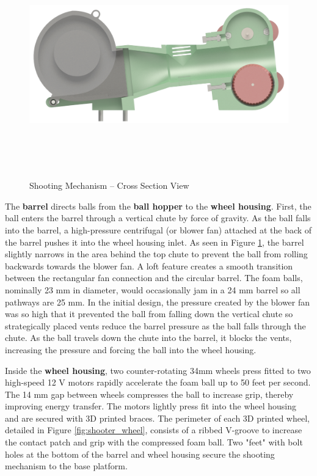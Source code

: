 \begin{figure}[H]   %
	\centering \includegraphics[width=6in, height=3.85in, keepaspectratio]{figures/shooter_xsec.png}
	\caption{Shooting Mechanism -- Cross Section View}	\label{fig:shooter_xsec}
\end{figure}

The \textbf{barrel} directs balls from the \textbf{ball hopper} to the \textbf{wheel housing}. First, the ball enters the barrel through a vertical chute by force of gravity. As the ball falls into the barrel, a high-pressure centrifugal (or blower fan) attached at the back of the barrel pushes it into the wheel housing inlet. As seen in Figure \ref{fig:shooter_xsec}, the barrel slightly narrows in the area behind the top chute to prevent the ball from rolling backwards towards the blower fan. A loft feature creates a smooth transition between the rectangular fan connection and the circular barrel. The foam balls, nominally 23 mm in diameter, would occasionally jam in a 24 mm barrel so all pathways are 25 mm. In the initial design, the pressure created by the blower fan was so high that it prevented the ball from falling down the vertical chute so strategically placed vents reduce the barrel pressure as the ball falls through the chute. As the ball travels down the chute into the barrel, it blocks the vents, increasing the pressure and forcing the ball into the wheel housing.

Inside the \textbf{wheel housing}, two counter-rotating 34mm wheels press fitted to two high-speed 12 V motors rapidly accelerate the foam ball up to 50 feet per second. The 14 mm gap between wheels compresses the ball to increase grip, thereby improving energy transfer. The motors lightly press fit into the wheel housing and are secured with 3D printed braces. The perimeter of each 3D printed wheel, detailed in Figure \ref{fig:shooter_wheel}, consists of a ribbed V-groove to increase the contact patch and grip with the compressed foam ball. Two "feet" with bolt holes at the bottom of the barrel and wheel housing secure the shooting mechanism to the base platform.

